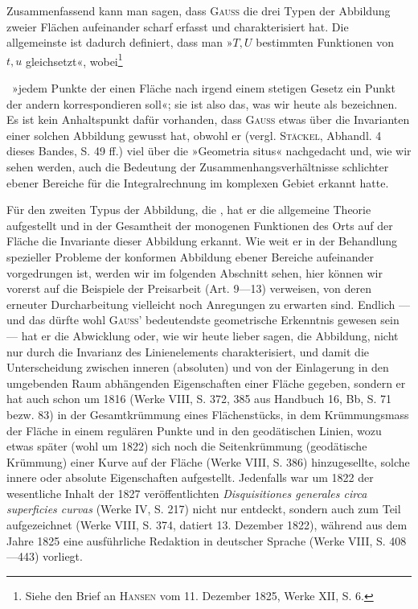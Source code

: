 Zusammenfassend kann man sagen, dass \textsc{Gauss} die drei Typen der Abbildung
zweier Flächen aufeinander scharf erfasst und charakterisiert hat. Die
allgemeinste ist dadurch definiert, dass man »\(T,U\) bestimmten Funktionen von
\(t,u\) gleichsetzt«, wobei\begingroup\renewcommand{\thefootnote}{260a)}\footnote{Siehe den Brief an \textsc{Hansen} vom 11. Dezember 1825, Werke XII, S. 6.}\addtocounter{footnote}{-1}\endgroup\ »jedem Punkte der einen Fläche nach irgend einem
stetigen Gesetz ein Punkt der andern korrespondieren soll«; sie ist also das,
was wir heute als \linebreak bezeichnen. Es ist kein Anhaltspunkt
dafür vorhanden, dass \textsc{Gauss} etwas über die Invarianten einer
solchen Abbildung gewusst hat, obwohl er (vergl. \textsc{Stäckel}, Abhandl. 4 dieses
Bandes, S. 49 ff.) viel über die »Geometria situs« nachgedacht und, wie wir
sehen werden, auch die Bedeutung der Zusammenhangsverhältnisse schlichter
ebener Bereiche für die Integralrechnung im komplexen Gebiet erkannt hatte.
\par\clearpage{}
\noindent Für den zweiten Typus der Abbildung, die , hat er die allgemeine
Theorie aufgestellt und in der Gesamtheit der monogenen Funktionen des Orts
auf der Fläche die Invariante dieser Abbildung erkannt. Wie weit er in der
Behandlung spezieller Probleme der konformen Abbildung ebener Bereiche aufeinander
vorgedrungen ist, werden wir im folgenden Abschnitt sehen, hier können
wir vorerst auf die Beispiele der Preisarbeit (Art. 9—13) verweisen, von deren
erneuter Durcharbeitung vielleicht noch Anregungen zu erwarten sind. Endlich
— und das dürfte wohl \textsc{Gauss}' bedeutendste geometrische Erkenntnis gewesen
sein — hat er die Abwicklung oder, wie wir heute lieber sagen, die 
Abbildung, nicht nur durch die Invarianz des Linienelements charakterisiert,
und damit die Unterscheidung zwischen inneren (absoluten) und von der
Einlagerung in den umgebenden Raum abhängenden Eigenschaften einer Fläche
gegeben, sondern er hat auch schon um 1816 (Werke VIII, S. 372, 385 aus
Handbuch 16, Bb, S. 71 bezw. 83) in der Gesamtkrümmung eines Flächenstücks,
in dem Krümmungsmass der Fläche in einem regulären Punkte und in den geodätischen
Linien, wozu etwas später (wohl um 1822) sich noch die Seitenkrümmung
(geodätische Krümmung) einer Kurve auf der Fläche (Werke VIII, S. 386)
hinzugesellte, solche innere oder absolute Eigenschaften aufgestellt. Jedenfalls
war um 1822 der wesentliche Inhalt der 1827 veröffentlichten \textit{Disquisitiones
generales circa superficies curvas} (Werke IV, S. 217) nicht nur entdeckt, sondern
auch zum Teil aufgezeichnet (Werke VIII, S. 374, datiert 13. Dezember 1822),
während aus dem Jahre 1825 eine ausführliche Redaktion in deutscher Sprache
(Werke VIII, S. 408—443) vorliegt.


